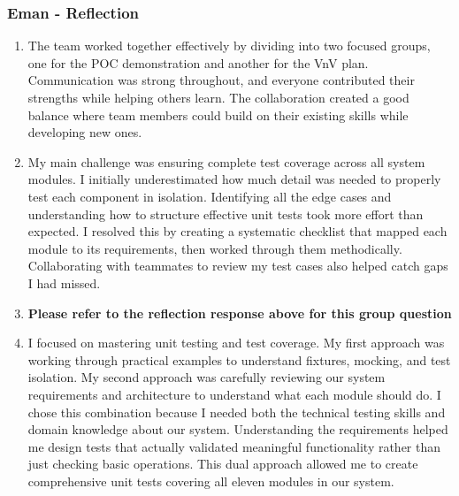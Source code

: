 \documentclass[12pt, titlepage]{article}
\begin{document}
\subsubsection*{Eman - Reflection}
    \begin{enumerate}
      \item The team worked together effectively by dividing into two focused groups, one for the POC demonstration and another for the VnV plan. Communication was strong throughout, and everyone contributed their strengths while helping others learn. The collaboration created a good balance where team members could build on their existing skills while developing new ones.
      \item My main challenge was ensuring complete test coverage across all system modules. I initially underestimated how much detail was needed to properly test each component in isolation. Identifying all the edge cases and understanding how to structure effective unit tests took more effort than expected. I resolved this by creating a systematic checklist that mapped each module to its requirements, then worked through them methodically. Collaborating with teammates to review my test cases also helped catch gaps I had missed.
      \item \textbf{Please refer to the reflection response above for this group question}
      \item I focused on mastering unit testing and test coverage. My first approach was working through practical examples to understand fixtures, mocking, and test isolation. My second approach was carefully reviewing our system requirements and architecture to understand what each module should do. I chose this combination because I needed both the technical testing skills and domain knowledge about our system. Understanding the requirements helped me design tests that actually validated meaningful functionality rather than just checking basic operations. This dual approach allowed me to create comprehensive unit tests covering all eleven modules in our system.
    \end{enumerate}
\end{document}
